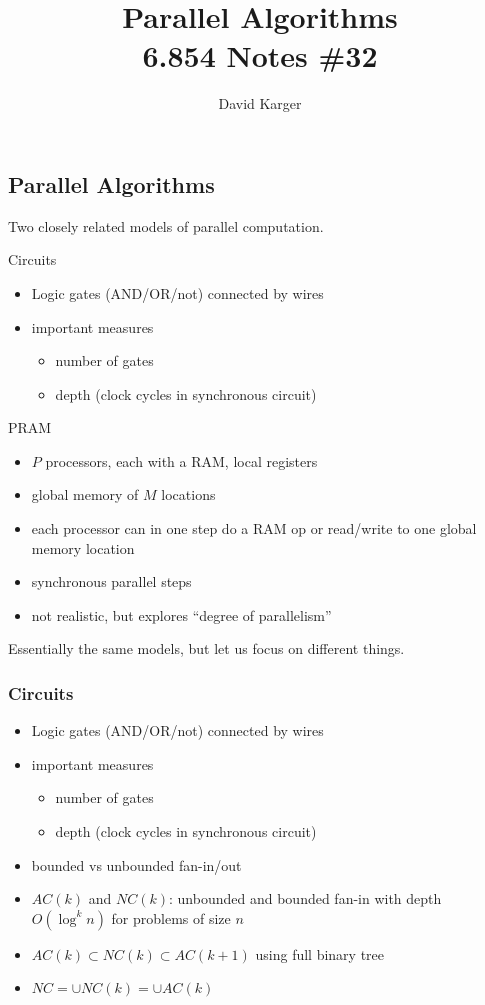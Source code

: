\documentclass[12pt]{article}
\title{Parallel Algorithms\\ 6.854 Notes \#32}
\author{David Karger}
\begin{document}

\subsection*{Parallel Algorithms}

Two closely related models of parallel computation.

Circuits
\begin{itemize}
\item Logic gates (AND/OR/not) connected by wires
\item important measures
\begin{itemize}
\item number of gates
\item depth (clock cycles in synchronous circuit)
\end{itemize}
\end{itemize}

PRAM
\begin{itemize}
\item $P$ processors, each with a RAM, local registers
\item global memory of $M$ locations
\item each processor can in one step do a RAM op or read/write to one
  global memory location
\item synchronous parallel steps
\item not realistic, but explores ``degree of parallelism''
\end{itemize}

Essentially the same models, but let us focus on different things.

\subsubsection*{Circuits}

\begin{itemize}
\item Logic gates (AND/OR/not) connected by wires
\item important measures
\begin{itemize}
\item number of gates
\item depth (clock cycles in synchronous circuit)
\end{itemize}
\item bounded vs unbounded fan-in/out
\item $AC(k)$ and $NC(k)$: unbounded and bounded fan-in with depth
  $O(\log^k n)$ for problems of size $n$
\item $AC(k) \subset NC(k) \subset AC(k+1)$ using full binary tree
\item $NC=\cup NC(k)=\cup AC(k)$
\end{itemize}
\end{document}
